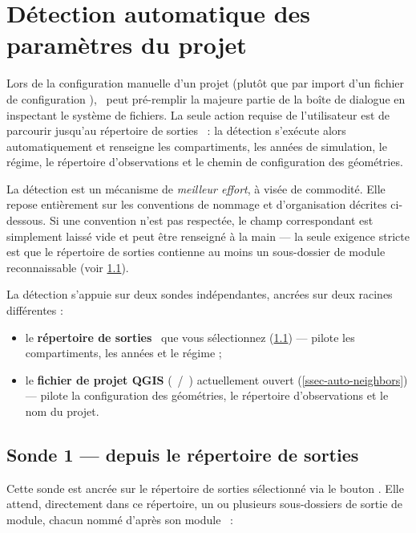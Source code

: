 \section{Détection automatique des paramètres du projet}
\label{sec-auto-detection}

Lors de la configuration manuelle d'un projet (plutôt que par import d'un fichier de configuration ), \cwv~peut pré-remplir la majeure partie de la boîte de dialogue  en inspectant le système de fichiers. La seule action requise de l'utilisateur est de parcourir jusqu'au répertoire de sorties \cawaqs~: la détection s'exécute alors automatiquement et renseigne les compartiments, les années de simulation, le régime, le répertoire d'observations et le chemin de configuration des géométries.

La détection est un mécanisme de \emph{meilleur effort}, à visée de commodité. Elle repose entièrement sur les conventions de nommage et d'organisation décrites ci-dessous. Si une convention n'est pas respectée, le champ correspondant est simplement laissé vide et peut être renseigné à la main --- la seule exigence stricte est que le répertoire de sorties contienne au moins un sous-dossier de module reconnaissable (voir \cref{ssec-auto-outcaw}).

La détection s'appuie sur deux sondes indépendantes, ancrées sur deux racines différentes :
\begin{itemize}
    \item le \textbf{répertoire de sorties} \cawaqs~que vous sélectionnez (\cref{ssec-auto-outcaw}) --- pilote les compartiments, les années et le régime ;

    \item le \textbf{fichier de projet QGIS} (~/~) actuellement ouvert (\cref{ssec-auto-neighbors}) --- pilote la configuration des géométries, le répertoire d'observations et le nom du projet.
\end{itemize}

\subsection{Sonde 1 --- depuis le répertoire de sorties \cawaqs}
\label{ssec-auto-outcaw}

Cette sonde est ancrée sur le répertoire de sorties sélectionné via le bouton . Elle attend, directement dans ce répertoire, un ou plusieurs sous-dossiers de sortie de module, chacun nommé d'après son module \cawaqs~:


